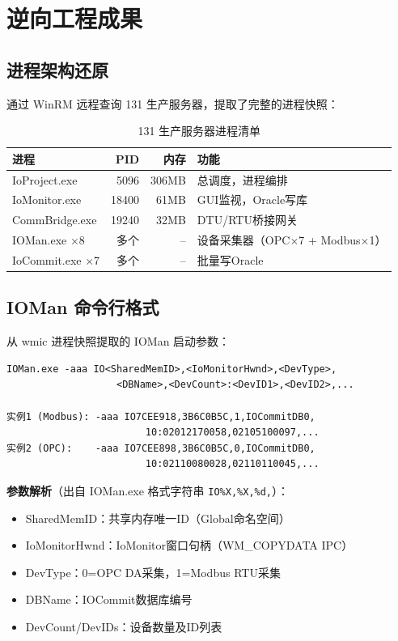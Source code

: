 \documentclass[12pt,a4paper]{ctexart}
\begin{document}
\section{逆向工程成果}

\subsection{进程架构还原}
通过 WinRM 远程查询 131 生产服务器，提取了完整的进程快照：

\begin{table}[H]\centering
\caption{131 生产服务器进程清单}
\begin{tabular}{lrrl}
\toprule
\textbf{进程} & \textbf{PID} & \textbf{内存} & \textbf{功能} \\
\midrule
IoProject.exe & 5096 & 306MB & 总调度，进程编排 \\
IoMonitor.exe & 18400 & 61MB & GUI监视，Oracle写库 \\
CommBridge.exe & 19240 & 32MB & DTU/RTU桥接网关 \\
IOMan.exe ×8 & 多个 & -- & 设备采集器（OPC×7 + Modbus×1） \\
IoCommit.exe ×7 & 多个 & -- & 批量写Oracle \\
\bottomrule
\end{tabular}
\end{table}

\subsection{IOMan 命令行格式}
从 wmic 进程快照提取的 IOMan 启动参数：

\begin{verbatim}
IOMan.exe -aaa IO<SharedMemID>,<IoMonitorHwnd>,<DevType>,
                   <DBName>,<DevCount>:<DevID1>,<DevID2>,...

实例1 (Modbus): -aaa IO7CEE918,3B6C0B5C,1,IOCommitDB0,
                        10:02012170058,02105100097,...
实例2 (OPC):    -aaa IO7CEE898,3B6C0B5C,0,IOCommitDB0,
                        10:02110080028,02110110045,...
\end{verbatim}

\textbf{参数解析}（出自 IOMan.exe 格式字符串 \texttt{IO\%X,\%X,\%d,}）：
\begin{itemize}[leftmargin=*]
  \item SharedMemID：共享内存唯一ID（Global命名空间）
  \item IoMonitorHwnd：IoMonitor窗口句柄（WM\_COPYDATA IPC）
  \item DevType：0=OPC DA采集，1=Modbus RTU采集
  \item DBName：IOCommit数据库编号
  \item DevCount/DevIDs：设备数量及ID列表
\end{itemize}
\end{document}
